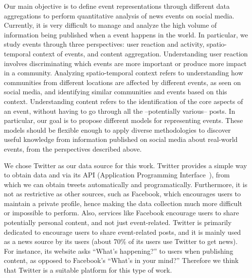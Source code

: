 Our main objective is to define event representations through different data
aggregations to perform quantitative analysis of news events on social media.
%
Currently, it is very difficult to manage and analyze the high volume of
information being published when a event happens in the world. 
%
In particular, we study events through three perspectives: user reaction
and activity, spatio-temporal context of events, and content aggregation.
%
Understanding user reaction involves discriminating which events are more
important or produce more impact in a community. 
%
Analyzing spatio-temporal context refers to understanding how communities from
different locations are affected by different events, as seen on social media,
and identifying similar communities and events based on this context. 
%
Understanding content refers to the identification of the core aspects of an
event, without having to go through all the --potentially various-- posts.
%
In particular, our goal is to propose different models for representing events. 
%
These models should be flexible enough to apply diverse methodologies to
discover useful knowledge from information published on social media about
real-world events, from the perspectives described above. 




We chose Twitter as our data source for this work. 
%
Twitter provides a simple way to obtain data and via its API (Application
Programming Interface~\cite{twitterapi}), from which we can obtain tweets
automatically and programatically. 
%
Furthermore, it is not as restrictive as other sources, such as Facebook, which
encourages users to maintain a private profile, hence making the data collection
much more difficult or impossible to perform.
%
Also, services like Facebook encourage users to share potentially personal
content, and not just event-related.
%
Twitter is primarily dedicated to encourage users to share event-related posts,
and it is mainly used as a news source by its users (about 70\% of its users use
Twitter to get news). 
%
For instance, its website asks ``What's happening?'' to users when publishing
content, as opposed to Facebook's ``What's in your mind?''
%
Therefore we think that Twitter is a suitable platform for this type of work.


